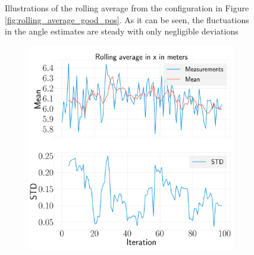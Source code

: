 \documentclass[../Head/report.tex]{subfiles}
\begin{document}
\begin{figure}[H]
\begin{subfigure}[t]{.30\textwidth}
        \caption{}
        \label{fig:rolling_average_in_yaw_test1}
    \end{subfigure}
    \caption{Illustrations of the rolling average from the configuration in Figure \ref{fig:rolling_average_good_pos}. As it can be seen, the fluctuations in the angle estimates are steady with only negligible deviations}
    \label{fig:rolling_average_angle_test1}
\end{figure}

\begin{figure}[H]
    \centering
    \begin{subfigure}[t]{.30\textwidth}
        \centering
        \includegraphics[width=\textwidth]{../Figures/analyse_rolling_average/test2/Calculated_rolling_average_in_x_with_mean_and_STD.png}
        \caption{}
        \label{fig:rolling_average_in_x_test2}
    \end{subfigure}
     \hspace{0.2em}
    \begin{subfigure}[t]{.30\textwidth}
        \centering

\end{subfigure}
\end{figure}
\end{document}
